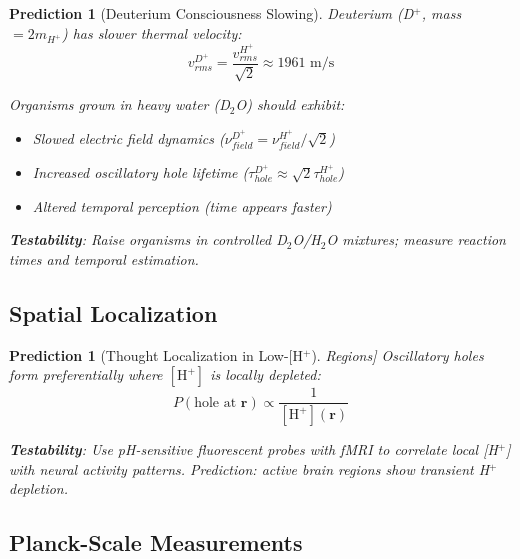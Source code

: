 \documentclass[12pt,a4paper]{article}
\newtheorem{prediction}[theorem]{Prediction}
\begin{document}
\begin{prediction}[Deuterium Consciousness Slowing]
Deuterium (D$^+$, mass $= 2m_{H^+}$) has slower thermal velocity:
\begin{equation}
v_{rms}^{D^+} = \frac{v_{rms}^{H^+}}{\sqrt{2}} \approx 1961 \text{ m/s}
\end{equation}

Organisms grown in heavy water (D$_2$O) should exhibit:
\begin{itemize}
\item Slowed electric field dynamics ($\nu_{field}^{D^+} = \nu_{field}^{H^+}/\sqrt{2}$)
\item Increased oscillatory hole lifetime ($\tau_{hole}^{D^+} \approx \sqrt{2} \tau_{hole}^{H^+}$)
\item Altered temporal perception (time appears faster)
\end{itemize}

\textbf{Testability}: Raise organisms in controlled D$_2$O/H$_2$O mixtures; measure reaction times and temporal estimation.
\end{prediction}

\subsection{Spatial Localization}

\begin{prediction}[Thought Localization in Low-[H$^+$] Regions]
Oscillatory holes form preferentially where $[\text{H}^+]$ is locally depleted:
\begin{equation}
P(\text{hole at } \mathbf{r}) \propto \frac{1}{[\text{H}^+](\mathbf{r})}
\end{equation}

\textbf{Testability}: Use pH-sensitive fluorescent probes with fMRI to correlate local [H$^+$] with neural activity patterns. Prediction: active brain regions show transient H$^+$ depletion.
\end{prediction}

\subsection{Planck-Scale Measurements}
\end{document}
